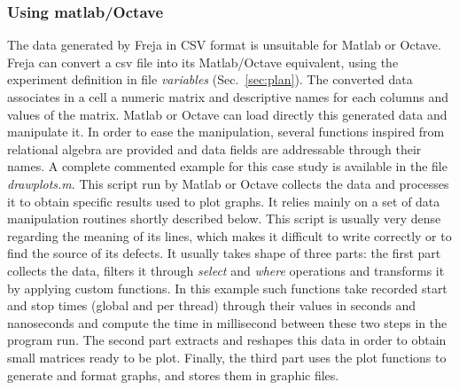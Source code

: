 \subsubsection{Using matlab/Octave}
The data generated by Freja in CSV format is unsuitable for Matlab or Octave. Freja can convert a csv file into its Matlab/Octave equivalent, using the experiment definition in file \emph{variables} (Sec.~\ref{sec:plan}). The converted data associates in a cell a numeric matrix and descriptive names for each columns and values of the matrix. Matlab or Octave can load directly this generated data and manipulate it. In order to ease the manipulation, several functions inspired from relational algebra are provided and data fields are addressable through their names. A complete commented example for this case study is available in the file \emph{drawplots.m}. This script run by Matlab or Octave collects the data and processes it to obtain specific results used to plot graphs. It relies mainly on a set of data manipulation routines shortly described below. This script is usually very dense regarding the meaning of its lines, which makes it difficult to write correctly or to find the source of its defects. It usually takes shape of three parts: the first part collects the data, filters it through \emph{select} and \emph{where} operations and transforms it by applying custom functions. In this example such functions take recorded start and stop times (global and per thread) through their values in seconds and nanoseconds and compute the time in millisecond between these two steps in the program run. The second part extracts and reshapes this data in order to obtain small matrices ready to be plot. Finally, the third part uses the plot functions to generate and format graphs, and stores them in graphic files.

